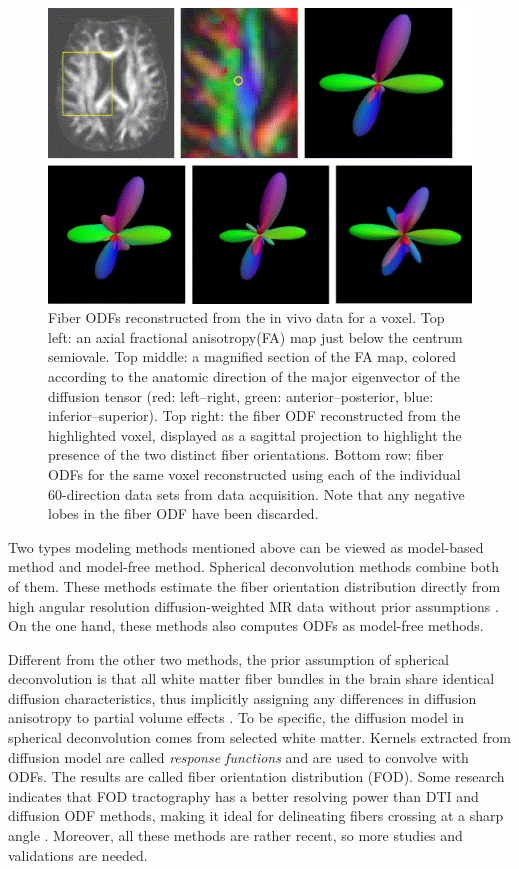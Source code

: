 \begin{figure}[ht]
    \centering
    \includegraphics[width= 12cm]{figures/odf.jpg}
        \caption{Fiber ODFs reconstructed from the in vivo data for a voxel.
          Top left: an axial fractional anisotropy(FA) map just below the centrum semiovale. 
          Top middle: a magnified section of the FA map, colored according to the anatomic direction of the major eigenvector of the diffusion tensor 
          (red: left–right, green: anterior–posterior, blue: inferior–superior). 
          Top right: the fiber ODF reconstructed from the highlighted voxel, 
          displayed as a sagittal projection to highlight the presence of the two distinct fiber orientations. 
          Bottom row: fiber ODFs for the same voxel reconstructed using each of the individual 60-direction data sets from data acquisition.
          Note that any negative lobes in the fiber ODF have been discarded. \cite*[]{tournierDirectEstimationFiber2004}
        }
    \label{fig:odf}
\end{figure}

Two types modeling methods mentioned above can be viewed as model-based method and model-free method. 
Spherical deconvolution methods combine both of them. These methods estimate the fiber orientation distribution directly from high angular resolution diffusion-weighted MR data without prior assumptions \cite*[]{tournierDirectEstimationFiber2004}.
On the one hand, these methods also computes ODFs as model-free methods. 

Different from the other two methods, the prior assumption of spherical deconvolution
is that all white matter fiber bundles in the brain share identical diffusion characteristics,
thus implicitly assigning any differences in diffusion anisotropy to partial volume effects \cite*[]{tournierDirectEstimationFiber2004}.
To be specific, the diffusion model in spherical deconvolution comes from selected white matter.
Kernels extracted from diffusion model are called \textit{response functions} and are used to convolve with ODFs.
The results are called fiber orientation distribution (FOD).
Some research indicates that FOD tractography has a better resolving power than DTI and diffusion ODF methods, making it ideal for delineating fibers crossing at a sharp angle \cite*[]{yehTractographyMethodsFindings2021}.
Moreover, all these methods are rather recent, so more studies and validations are needed.

